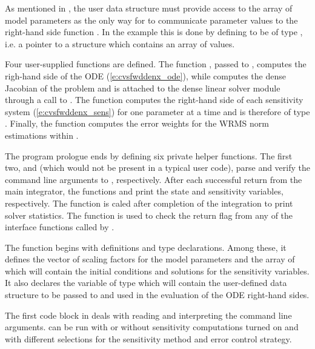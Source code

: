As mentioned in , the user data
structure  must provide access to the array of model parameters 
as the only way for {\cvodes} to communicate parameter values to the right-hand side 
function . In the  example this is done by defining  to be 
of type , i.e. a pointer to a structure which contains an array of 
  values.

Four user-supplied functions are defined. The function , passed to
, computes the righ-hand side of the ODE (\ref{e:cvsfwddenx_ode}), while
 computes the dense Jacobian of the problem and is attached to the
dense linear solver module {\cvdense} through a call to .
The function  computes the right-hand side of each sensitivity system
(\ref{e:cvsfwddenx_sens}) for one parameter at a time and is therefore of type
. Finally, the function  computes the error weights for the WRMS norm
estimations within {\cvodes}.

The program prologue ends by defining six private helper functions. 
The first two,  and  (which would not be present in 
a typical user code), parse and verify the command line arguments to , respectively.
After each successful return from the main {\cvodes} integrator, the functions 
 and  print the state and sensitivity variables,
respectively. The function  is caled after completion of the
integration to print solver statistics.
The function  is used to check the return flag from any of the
{\cvodes} interface functions called by .

The  function begins with definitions and type declarations. 
Among these, it defines the vector  of  scaling factors for
the model parameters   and the array  of 
 which will contain the initial conditions and solutions for the sensitivity
variables. It also declares the variable  of type  
which will contain the user-defined data structure to be passed to {\cvodes} and used in the 
evaluation of the ODE right-hand sides.

The first code block in  deals with reading and interpreting the
command line arguments.  can be run with or without sensitivity computations
turned on and with different selections for the sensitivity method and error control strategy.

